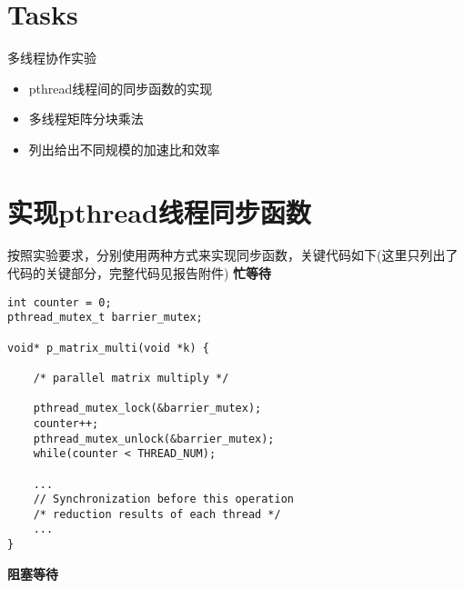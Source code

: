 \documentclass{article}
\title{
    \centering\textbf{ \hmwkTitle}
    \author{\hmwkAuthorName}
}
\begin{document}
\maketitle

\section{Tasks}
多线程协作实验
\begin{itemize}
    \item pthread线程间的同步函数的实现
    \item 多线程矩阵分块乘法
    \item 列出给出不同规模的加速比和效率
\end{itemize}

\section{实现pthread线程同步函数}
按照实验要求，分别使用两种方式来实现同步函数，关键代码如下(这里只列出了代码的关键部分，完整代码见报告附件)
\newline
\textbf{忙等待}
\begin{lstlisting}
int counter = 0;
pthread_mutex_t barrier_mutex;

void* p_matrix_multi(void *k) {

    /* parallel matrix multiply */

    pthread_mutex_lock(&barrier_mutex);
    counter++;
    pthread_mutex_unlock(&barrier_mutex);
    while(counter < THREAD_NUM);

    ...
    // Synchronization before this operation
    /* reduction results of each thread */
    ...
}
\end{lstlisting}

\textbf{阻塞等待}
\end{document}
